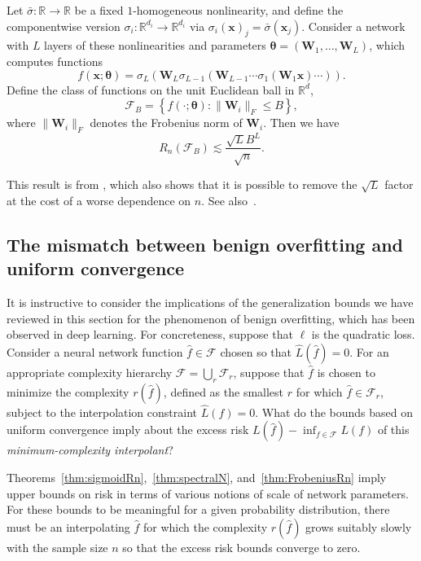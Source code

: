 \begin{theorem}\label{thm:FrobeniusRn}
Let $\bar\sigma:{\mathbb R}\to{\mathbb R}$ be a fixed $1$-homogeneous nonlinearity, and define the componentwise version
$\sigma_i:{\mathbb R}^{d_i}\to{\mathbb R}^{d_i}$ via
$\sigma_i({\boldsymbol x})_j=\bar\sigma({\boldsymbol x}_j)$. Consider a network with $L$ layers of these nonlinearities and parameters ${\boldsymbol \theta}=({\boldsymbol W}_1,\ldots,{\boldsymbol W}_L)$, which computes functions
  \[
    f({\boldsymbol x};{\boldsymbol \theta}) =
      \sigma_L({\boldsymbol W}_L\sigma_{L-1}({\boldsymbol W}_{L-1} \cdots \sigma_1({\boldsymbol W}_1{\boldsymbol x})\cdots)).
  \]
Define the class of functions on the unit Euclidean ball in ${\mathbb R}^d$,
  \[
    {\mathcal F}_B = \left\{f(\cdot;{\boldsymbol \theta}): \|{\boldsymbol W}_i\|_F\le B \right\},
  \]
where $\|{\boldsymbol W}_i\|_F$ denotes the Frobenius norm of ${\boldsymbol W}_i$. Then we have
  \[
    R_n({\mathcal F}_B) \lesssim \frac{\sqrt{L}B^L}{\sqrt n}.
  \]
\end{theorem}

This result is from \cite{pmlr-v75-golowich18a}, which also shows that it is possible to remove the $\sqrt{L}$ factor at the cost of a worse dependence on $n$. See also~\cite{pmlr-v40-Neyshabur15}.

\subsection{The mismatch between benign overfitting and uniform convergence}
\label{sec:slt_mismatch}

It is instructive to consider the implications of the generalization bounds we have reviewed in this section for the phenomenon of benign overfitting, which has been observed in deep learning. For concreteness, suppose that $\ell$ is the quadratic loss.  Consider a neural network function $\widehat f\in {\mathcal F}$ chosen so that $\widehat
L(\widehat
f)=0$. For an appropriate complexity hierarchy ${\mathcal F}=\bigcup_r {\mathcal F}_r$, suppose that $\widehat f$ is chosen to minimize the complexity
$r(\widehat
f)$, defined as the smallest $r$ for which $\widehat f\in {\mathcal F}_r$, subject to the interpolation constraint $\widehat L(f)=0$. What do the bounds based on uniform convergence imply about the excess risk $L(\widehat
f)-\inf_{f\in{\mathcal F}}L(f)$ of this {\em minimum-complexity interpolant}?

Theorems~\ref{thm:sigmoidRn},~\ref{thm:spectralN},
and~\ref{thm:FrobeniusRn} imply upper bounds on risk in terms of various notions of scale of network parameters. For these bounds to be meaningful for a given probability distribution, there must be an interpolating $\widehat f$ for which the complexity $r(\widehat f)$ grows suitably slowly with the sample size $n$ so that the excess risk bounds converge to zero.

